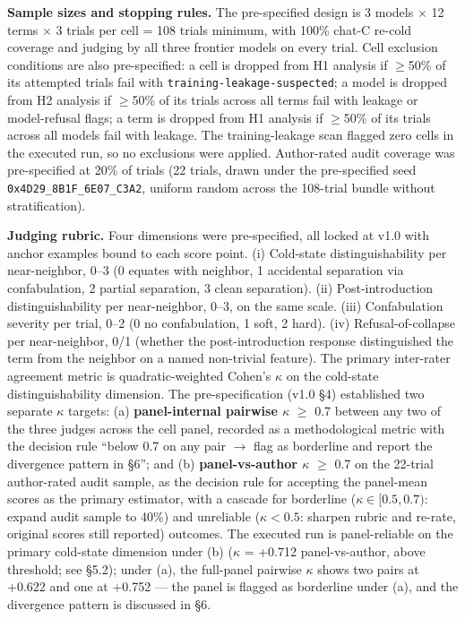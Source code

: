 \documentclass[11pt,a4paper]{article}
\begin{document}
\textbf{Sample sizes and stopping rules.} The pre-specified design is 3 models $\times$ 12 terms $\times$ 3 trials per cell = 108 trials minimum, with 100\% chat-C re-cold coverage and judging by all three frontier models on every trial. Cell exclusion conditions are also pre-specified: a cell is dropped from H1 analysis if $\geq$50\% of its attempted trials fail with \texttt{training-leakage-suspected}; a model is dropped from H2 analysis if $\geq$50\% of its trials across all terms fail with leakage or model-refusal flags; a term is dropped from H1 analysis if $\geq$50\% of its trials across all models fail with leakage. The training-leakage scan flagged zero cells in the executed run, so no exclusions were applied. Author-rated audit coverage was pre-specified at 20\% of trials (22 trials, drawn under the pre-specified seed \texttt{0x4D29\_8B1F\_6E07\_C3A2}, uniform random across the 108-trial bundle without stratification).

\textbf{Judging rubric.} Four dimensions were pre-specified, all locked at v1.0 with anchor examples bound to each score point. (i) Cold-state distinguishability per near-neighbor, 0--3 (0 equates with neighbor, 1 accidental separation via confabulation, 2 partial separation, 3 clean separation). (ii) Post-introduction distinguishability per near-neighbor, 0--3, on the same scale. (iii) Confabulation severity per trial, 0--2 (0 no confabulation, 1 soft, 2 hard). (iv) Refusal-of-collapse per near-neighbor, 0/1 (whether the post-introduction response distinguished the term from the neighbor on a named non-trivial feature). The primary inter-rater agreement metric is quadratic-weighted Cohen's $\kappa$ on the cold-state distinguishability dimension. The pre-specification (v1.0 \S4) established two separate $\kappa$ targets: (a) \textbf{panel-internal pairwise $\kappa$} $\geq$ 0.7 between any two of the three judges across the cell panel, recorded as a methodological metric with the decision rule ``below 0.7 on any pair $\to$ flag as borderline and report the divergence pattern in \S6''; and (b) \textbf{panel-vs-author $\kappa$} $\geq$ 0.7 on the 22-trial author-rated audit sample, as the decision rule for accepting the panel-mean scores as the primary estimator, with a cascade for borderline ($\kappa \in [0.5, 0.7)$: expand audit sample to 40\%) and unreliable ($\kappa < 0.5$: sharpen rubric and re-rate, original scores still reported) outcomes. The executed run is panel-reliable on the primary cold-state dimension under (b) ($\kappa$ = +0.712 panel-vs-author, above threshold; see \S5.2); under (a), the full-panel pairwise $\kappa$ shows two pairs at +0.622 and one at +0.752 --- the panel is flagged as borderline under (a), and the divergence pattern is discussed in \S6.
\end{document}
